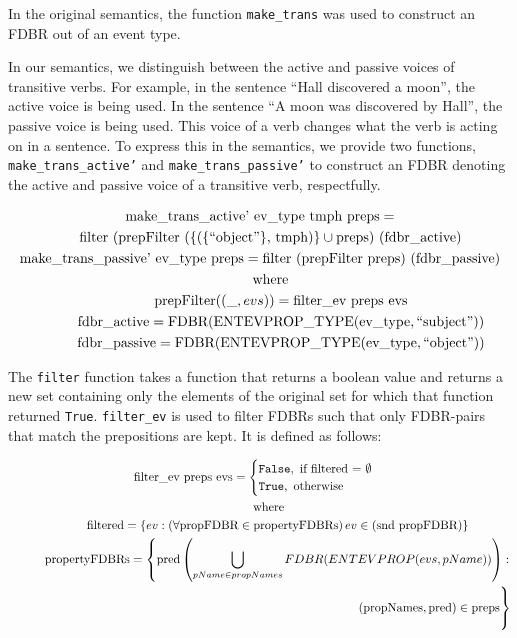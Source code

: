 \documentclass[../main.tex]{subfiles}
\begin{document}
In the original semantics, the function \texttt{make\_trans} was used to
construct an FDBR out of an event type.

In our semantics, we distinguish between the active and passive voices of transitive verbs.  For example, in the sentence ``Hall discovered a moon'', the active voice is being used.
In the sentence ``A moon was discovered by Hall'', the passive voice is being
used.  This voice of a verb changes what the verb is acting on in  a sentence.  To express this in the semantics,
we provide two functions, \texttt{make\_trans\_active'} and \texttt{make\_trans\_passive'} to construct an FDBR denoting the active and passive voice of a transitive verb, respectfully.

\begin{gather*}
\text{make\_trans\_active' ev\_type tmph preps} = \\
	\text{\indent filter (prepFilter (\{(\{``object''\}, tmph)\}} \cup \text{preps) (\text{fdbr\_active})} \\
\text{make\_trans\_passive' ev\_type preps} = \text{filter (prepFilter preps) (\text{fdbr\_passive})} \\
\text{\indent where} \\
\text{\indent\indent prepFilter} ((\_, evs)) = \text{filter\_ev preps evs} \\
\text{\indent\indent fdbr\_active} = \text{FDBR}(\text{ENTEVPROP\_TYPE}(\text{ev\_type}, \text{``subject''})) \\
\text{\indent\indent fdbr\_passive} = \text{FDBR}(\text{ENTEVPROP\_TYPE}(\text{ev\_type}, \text{``object''}))
\end{gather*}

The \texttt{filter} function takes a function that returns a boolean value and returns a new set containing only the elements of the original set for which that function returned \texttt{True}.
\texttt{filter\_ev} is used to filter FDBRs such that only FDBR-pairs that match
the prepositions are kept. It is defined as follows:

\begin{gather*}
\text{filter\_ev preps evs} =
\begin{cases}
\texttt{False}, \text{ if filtered = } \emptyset \\
\texttt{True}, \text{ otherwise}
\end{cases} \\
\text{\indent where} \\
\text{\indent\indent filtered} = \left\{ ev : \left( \forall \text{propFDBR} \in
\text{propertyFDBRs} \right) ev \in \text{(snd propFDBR)} \right\}  \\
\begin{split}
\text{\indent\indent propertyFDBRs} = \left\{ \text{pred}\left(\bigcup_{pName \in propNames} FDBR(ENTEVPROP(evs, pName)) \right) : \right. \\
\left. (\text{propNames}, \text{pred}) \in \text{preps} \vphantom{\bigcup_{pName \in propNames}} \right\}
\end{split}
\end{gather*}
\end{document}
